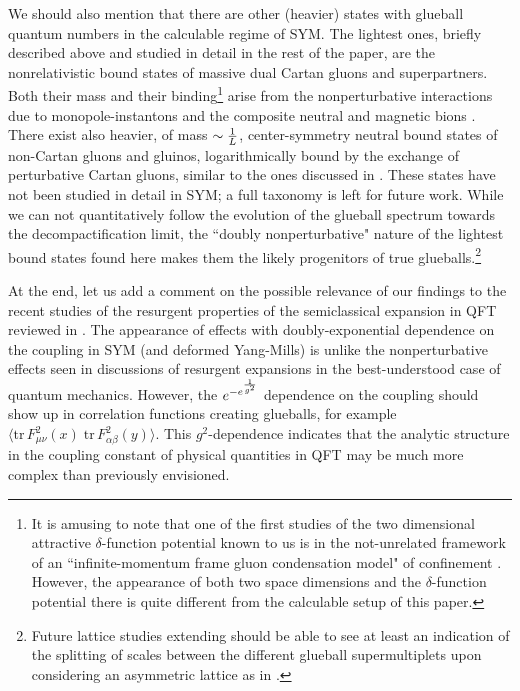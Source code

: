 \documentclass[11pt]{article}
\newcommand{\tr}{\mathrm{tr}\,}
\begin{document}
We should also mention that there are other (heavier) states with glueball quantum numbers in the calculable regime of SYM. The lightest ones, briefly described above and studied in detail in the rest of the paper, are the nonrelativistic bound states of massive dual Cartan gluons and superpartners.  Both their  mass and their binding\footnote{It is  amusing to note that one of the first studies   of the two dimensional attractive $\delta$-function potential  known to us is in the not-unrelated framework of an ``infinite-momentum frame gluon condensation model" of confinement  \cite{Thorn:1978kf}. However, the appearance of both two space dimensions and the $\delta$-function potential there is quite different from the calculable setup of this paper.} arise from  the  nonperturbative interactions due to monopole-instantons and the composite neutral and magnetic bions \cite{Unsal:2007jx,
Poppitz:2011wy,
Argyres:2012ka}. There exist also heavier, of mass $\sim{1\over L}$, center-symmetry neutral bound states of non-Cartan gluons and gluinos, logarithmically bound by the exchange of perturbative Cartan gluons, similar to the ones discussed in \cite{Aitken:2017ayq}. These states have not been studied in detail in SYM; a full taxonomy is left for future work. While we can not  quantitatively follow the evolution of the glueball spectrum   towards the decompactification limit,  the ``doubly nonperturbative" nature of the lightest bound states found here makes them the   likely progenitors of true glueballs.\footnote{Future lattice studies extending  \cite{Ali:2017iof, Bergner:2015adz}
 should be able to see at least an indication of the splitting of scales between the different glueball supermultiplets upon considering an asymmetric lattice as in \cite{Bergner:2014dua}.}
 
 At the end,  let us add a comment on the possible relevance of our findings to the recent studies of the resurgent properties of the semiclassical expansion in QFT  reviewed in \cite{Dunne:2016nmc}. The appearance of effects with  doubly-exponential dependence on the coupling in SYM (and deformed Yang-Mills) is unlike the nonperturbative effects  seen in discussions of resurgent expansions in the best-understood case of quantum mechanics. However, the   $e^{- e^{1\over g^2}}$ dependence on the coupling  should show up in correlation functions creating glueballs, for example  $\langle \tr  F^2_{\mu\nu}(x) \; \tr  F^2_{\alpha\beta}(y) \rangle$. This $g^2$-dependence indicates that the analytic structure in the coupling constant of physical quantities in QFT may be much more complex than previously envisioned.
\end{document}
